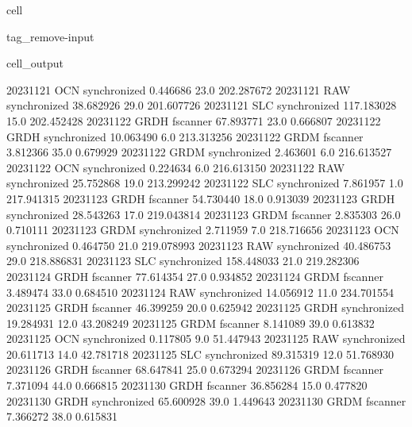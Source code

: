 \documentclass[letterpaper,10pt,english]{jupyterBook}
\begin{document}
\begin{sphinxuseclass}{cell}
\begin{sphinxuseclass}{tag_remove-input}
\begin{sphinxVerbatimOutput}
\begin{sphinxuseclass}{cell_output}
\begin{sphinxVerbatim}[commandchars=\\\{\}]
2023\PYGZhy{}11\PYGZhy{}21          OCN  synchronized    0.446686    23.0  202.287672
2023\PYGZhy{}11\PYGZhy{}21          RAW  synchronized   38.682926    29.0  201.607726
2023\PYGZhy{}11\PYGZhy{}21          SLC  synchronized  117.183028    15.0  202.452428
2023\PYGZhy{}11\PYGZhy{}22         GRDH      fscanner   67.893771    23.0    0.666807
2023\PYGZhy{}11\PYGZhy{}22         GRDH  synchronized   10.063490     6.0  213.313256
2023\PYGZhy{}11\PYGZhy{}22         GRDM      fscanner    3.812366    35.0    0.679929
2023\PYGZhy{}11\PYGZhy{}22         GRDM  synchronized    2.463601     6.0  216.613527
2023\PYGZhy{}11\PYGZhy{}22          OCN  synchronized    0.224634     6.0  216.613150
2023\PYGZhy{}11\PYGZhy{}22          RAW  synchronized   25.752868    19.0  213.299242
2023\PYGZhy{}11\PYGZhy{}22          SLC  synchronized    7.861957     1.0  217.941315
2023\PYGZhy{}11\PYGZhy{}23         GRDH      fscanner   54.730440    18.0    0.913039
2023\PYGZhy{}11\PYGZhy{}23         GRDH  synchronized   28.543263    17.0  219.043814
2023\PYGZhy{}11\PYGZhy{}23         GRDM      fscanner    2.835303    26.0    0.710111
2023\PYGZhy{}11\PYGZhy{}23         GRDM  synchronized    2.711959     7.0  218.716656
2023\PYGZhy{}11\PYGZhy{}23          OCN  synchronized    0.464750    21.0  219.078993
2023\PYGZhy{}11\PYGZhy{}23          RAW  synchronized   40.486753    29.0  218.886831
2023\PYGZhy{}11\PYGZhy{}23          SLC  synchronized  158.448033    21.0  219.282306
2023\PYGZhy{}11\PYGZhy{}24         GRDH      fscanner   77.614354    27.0    0.934852
2023\PYGZhy{}11\PYGZhy{}24         GRDM      fscanner    3.489474    33.0    0.684510
2023\PYGZhy{}11\PYGZhy{}24          RAW  synchronized   14.056912    11.0  234.701554
2023\PYGZhy{}11\PYGZhy{}25         GRDH      fscanner   46.399259    20.0    0.625942
2023\PYGZhy{}11\PYGZhy{}25         GRDH  synchronized   19.284931    12.0   43.208249
2023\PYGZhy{}11\PYGZhy{}25         GRDM      fscanner    8.141089    39.0    0.613832
2023\PYGZhy{}11\PYGZhy{}25          OCN  synchronized    0.117805     9.0   51.447943
2023\PYGZhy{}11\PYGZhy{}25          RAW  synchronized   20.611713    14.0   42.781718
2023\PYGZhy{}11\PYGZhy{}25          SLC  synchronized   89.315319    12.0   51.768930
2023\PYGZhy{}11\PYGZhy{}26         GRDH      fscanner   68.647841    25.0    0.673294
2023\PYGZhy{}11\PYGZhy{}26         GRDM      fscanner    7.371094    44.0    0.666815
2023\PYGZhy{}11\PYGZhy{}30         GRDH      fscanner   36.856284    15.0    0.477820
2023\PYGZhy{}11\PYGZhy{}30         GRDH  synchronized   65.600928    39.0    1.449643
2023\PYGZhy{}11\PYGZhy{}30         GRDM      fscanner    7.366272    38.0    0.615831

\end{sphinxVerbatim}
\end{sphinxuseclass}
\end{sphinxVerbatimOutput}
\end{sphinxuseclass}
\end{sphinxuseclass}
\end{document}
